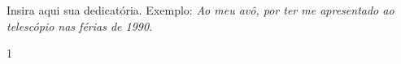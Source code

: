 \maketitle

\begin{itadedication}
Insira aqui sua dedicatória. Exemplo: \textit{Ao meu avô, por ter me apresentado ao telescópio nas férias de 1990}.
\end{itadedication}

\begin{itathanks}

\end{itathanks}

\thispagestyle{empty}
\ifhyperref{}\fi
\begin{flushright}
\begin{spacing}{1}
\mbox{}\vfill

\end{spacing}
\end{flushright}

\begin{abstract}
\noindent

\end{abstract}

\begin{englishabstract}
\noindent

\end{englishabstract}

\listoffigures %

\listoftables %



\tableofcontents
